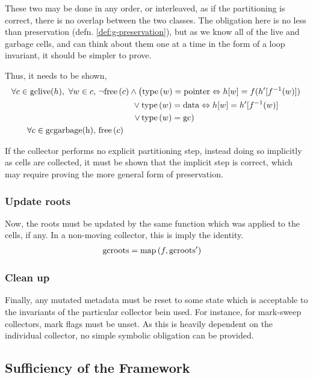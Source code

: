 These two may be done in any order, or interleaved, as if the
partitioning is correct, there is no overlap between the two
classes. The obligation here is no less than preservation
(defn. \ref{def:g-preservation}), but as we know all of the live and
garbage cells, and can think about them one at a time in the form of a
loop invariant, it should be simpler to prove.

Thus, it needs to be shown,
\begin{align*}
  \forall c \in \mathrm{gclive}(h),\ \forall w \in c,\ & \lnot\mathrm{free}\left(c\right) \land 
  \left(\mathrm{type}\left(w\right) = \mathrm{pointer} \Leftrightarrow h[w] =
    f(h'[f^{-1}(w)])\right.\\
  &\quad\quad\quad\quad \lor \mathrm{type}\left(w\right) = \mathrm{data}
  \Leftrightarrow h[w] = h'[f^{-1}(w)]\\
  &\quad\quad\quad\quad \left.\lor\thinspace\mathrm{type}\left(w\right) =
    \mathrm{gc}\right)\\
  \forall c \in \mathrm{gcgarbage(h)},\ & \mathrm{free}\left(c\right)
\end{align*}

If the collector performs no explicit partitioning step, instead doing
so implicitly as cells are collected, it must be shown that the
implicit step is correct, which may require proving the more general
form of preservation.

\subsubsection{Update roots}
\label{sec:gc-framework-obligations-roots}

Now, the roots must be updated by the same function which was applied
to the cells, if any. In a non-moving collector, this is imply the
identity.
\begin{align*}
  \mathrm{gcroots} &= \mathrm{map}\left(f, \mathrm{gcroots'}\right)
\end{align*}

\subsubsection{Clean up}
\label{sec:gc-framework-obligations-clean}

Finally, any mutated metadata must be reset to some state which is
acceptable to the invariants of the particular collector bein
used. For instance, for mark-sweep collectors, mark flags must be
unset. As this is heavily dependent on the individual collector, no
simple symbolic obligation can be provided.

\subsection{Sufficiency of the Framework}
\label{sec:gc-framework-sufficiency}

